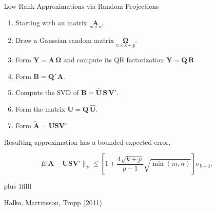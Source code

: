 \documentclass[11pt,ignorenonframetext,]{beamer}
\providecommand{\tightlist}{%
  \setlength{\itemsep}{0pt}\setlength{\parskip}{0pt}}
\newcommand{\vvfill}{\vskip0pt plus 1filll}
\begin{document}
\begin{frame}{Low Rank Approximations via Random Projections}
\protect\hypertarget{low-rank-approximations-via-random-projections}{}

\begin{enumerate}
[1.]
\tightlist
\item
  Starting with an matrix \(\underset{m \times n}{\symbf{A}}\).
\end{enumerate}

\pause

\begin{enumerate}
[1.]
\setcounter{enumi}{1}
\tightlist
\item
  Draw a Gaussian random matrix
  \(\underset{n \times k+p}{\symbf{\Omega}}\).
\end{enumerate}

\pause

\begin{enumerate}
[1.]
\setcounter{enumi}{2}
\tightlist
\item
  Form \(\symbf{Y} = \symbf{A}\,\symbf{\Omega}\) and compute its QR
  factorization \(\symbf{Y} = \symbf{Q}\,\symbf{R}\)
\end{enumerate}

\pause

\begin{enumerate}
[1.]
\setcounter{enumi}{3}
\tightlist
\item
  Form \(\symbf{B}=\symbf{Q}'\,\symbf{A}\).
\end{enumerate}

\pause

\begin{enumerate}
[1.]
\setcounter{enumi}{4}
\tightlist
\item
  Compute the SVD of
  \(\symbf{B} = \symbf{\hat{U}}\,\symbf{S}\,\symbf{V}'\).
\end{enumerate}

\pause

\begin{enumerate}
[1.]
\setcounter{enumi}{5}
\tightlist
\item
  Form the matrix \(\symbf{U} = \symbf{Q} \, \symbf{\hat{U}}\).
\end{enumerate}

\pause

\begin{enumerate}
[1.]
\setcounter{enumi}{6}
\tightlist
\item
  Form \(\symbf{\tilde{A}} = \symbf{U}\symbf{S}\symbf{V}'\)
\end{enumerate}

\vspace{2mm}

Resulting approximation has a bounded expected error,

\[ E| \symbf{A} - \symbf{U}\symbf{S}\symbf{V}'\|_F \leq \left[1 + \frac{4\sqrt{k+p}}{p-1} \sqrt{\min(m,n)} \right] \sigma_{k+1}. \]

\vvfill

\footnotesize
\begin{center}
Halko, Martinsson, Tropp (2011)
\end{center}

\end{frame}
\end{document}
